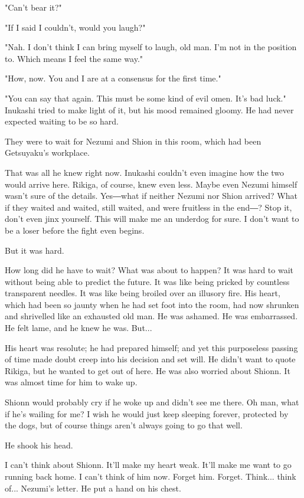 "Can't bear it?"

"If I said I couldn't, would you laugh?"

"Nah. I don't think I can bring myself to laugh, old man. I'm not in the
position to. Which means I feel the same way."

"How, now. You and I are at a consensus for the first time."

"You can say that again. This must be some kind of evil omen. It's bad
luck." Inukashi tried to make light of it, but his mood remained gloomy.
He had never expected waiting to be so hard.

They were to wait for Nezumi and Shion in this room, which had been
Getsuyaku's workplace.

That was all he knew right now. Inukashi couldn't even imagine how the
two would arrive here. Rikiga, of course, knew even less. Maybe even
Nezumi himself wasn't sure of the details. Yes―what if neither Nezumi
nor Shion arrived? What if they waited and waited, still waited, and
were fruitless in the end―? Stop it, don't even jinx yourself. This will
make me an underdog for sure. I don't want to be a loser before the
fight even begins.

But it was hard.

How long did he have to wait? What was about to happen? It was hard to
wait without being able to predict the future. It was like being pricked
by countless transparent needles. It was like being broiled over an
illusory fire. His heart, which had been so jaunty when he had set foot
into the room, had now shrunken and shrivelled like an exhausted old
man. He was ashamed. He was embarrassed. He felt lame, and he knew he
was. But...

His heart was resolute; he had prepared himself; and yet this
purposeless passing of time made doubt creep into his decision and set
will. He didn't want to quote Rikiga, but he wanted to get out of here.
He was also worried about Shionn. It was almost time for him to wake up.

Shionn would probably cry if he woke up and didn't see me there. Oh man,
what if he's wailing for me? I wish he would just keep sleeping forever,
protected by the dogs, but of course things aren't always going to go
that well.

He shook his head.

I can't think about Shionn. It'll make my heart weak. It'll make me want
to go running back home. I can't think of him now. Forget him. Forget.
Think... think of... Nezumi's letter. He put a hand on his chest.

